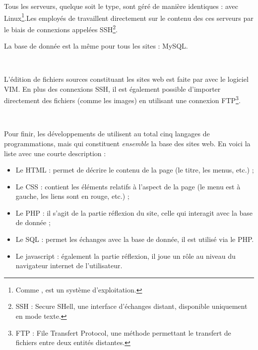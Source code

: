 Tous les serveurs, quelque soit le type, sont géré de manière identiques : avec Linux\footnote{Comme ,  est un système d'exploitation.}.Les employés de \fidit{} travaillent directement sur le contenu des ces serveurs par le biais de connexions appelées SSH\footnote{SSH : Secure SHell, une interface d'échanges distant, disponible uniquement en mode texte.}.

La base de donnée est la même pour tous les sites : MySQL.

~

L'édition de fichiers sources constituant les sites web est faite par avec le logiciel VIM. En plus des connexions SSH, il est également possible d'importer directement des fichiers (comme les images) en utilisant une connexion FTP\footnote{FTP : File Transfert Protocol, une méthode permettant le transfert de fichiers entre deux entités distantes.}.

~

Pour finir, les développements de \fidit{} utilisent au total cinq langages de programmations, mais qui constituent \emph{ensemble} la base des sites web. En voici la liste avec une courte description :
\begin{itemize}
	\item Le HTML : permet de décrire le contenu de la page (le titre, les menus, etc.) ;
	\item Le CSS : contient les éléments relatifs à l'aspect de la page (le menu est à gauche, les liens sont en rouge, etc.) ;
	\item Le PHP : il s'agit de la partie \og réflexion \fg du site, celle qui interagit avec la base de donnée ;
	\item Le SQL : permet les échanges avec la base de donnée, il est utilisé via le PHP.
	\item Le javascript : également la partie réflexion, il joue un rôle au niveau du navigateur internet de l'utilisateur.
\end{itemize}
